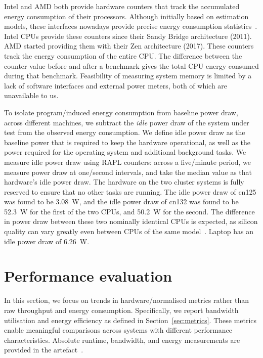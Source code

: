 Intel and AMD both provide hardware counters that track the accumulated energy consumption of their processors.
Although initially based on estimation models, these interfaces nowadays provide precise energy consumption statistics~\cite{khan2018rapl}.
Intel CPUs provide these counters since their Sandy Bridge architecture (2011).
AMD started providing them with their Zen architecture (2017).
These counters track the energy consumption of the entire CPU.
The difference between the counter value before and after a benchmark gives the total CPU energy consumed during that benchmark.
Feasibility of measuring system memory is limited by a lack of software interfaces and external power meters, both of which are unavailable to us.

To isolate program\-/induced energy consumption from baseline power draw, across different machines, we subtract the \emph{idle} power draw of the system under
test from the observed energy consumption.
We define idle power draw as the baseline power that is required to keep the hardware operational, as well as the power required for the operating system and additional background tasks.
We measure idle power draw using RAPL counters: across a five\-/minute period, we measure power draw at one\-/second intervals, and take the median value as that hardware's idle power draw.
The hardware on the two cluster systems is fully reserved to ensure that no other tasks are running.
The idle power draw of cn125 was found to be \qty{3.08}{\watt}, and the idle power draw of cn132 was found to be \qty{52.3}{\watt} for the first of the two CPUs, and \qty{50.2}{\watt} for the second.
The difference in power draw between these two nominally identical CPUs is expected, as silicon quality can vary greatly even between CPUs of the same model~\cite{kistowski2016variations}.
Laptop has an idle power draw of \qty{6.26}{\watt}.

\section{Performance evaluation}\label{sec:evaluation}
In this section, we focus on trends in hardware\-/normalised metrics rather than raw throughput and energy consumption.
Specifically, we report bandwidth utilisation and energy efficiency as defined in Section~\ref{sec:metrics}.
These metrics enable meaningful comparisons across systems with different performance characteristics.
Absolute runtime, bandwidth, and energy measurements are provided in the artefact~\cite{vqhull2025artefact}.

